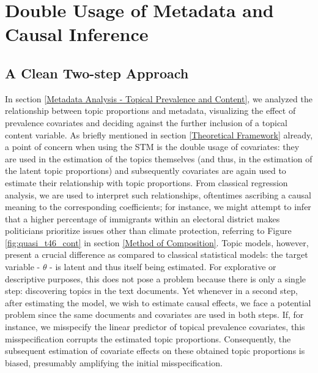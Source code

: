 \section{Double Usage of Metadata and Causal Inference}
\label{Overfitting and Causal Inference - Alternative Modeling Strategies}

\subsection{A Clean Two-step Approach}
\label{Two-step Approach: CTM}

In section \ref{Metadata Analysis - Topical Prevalence and Content}, we analyzed the relationship between topic proportions and metadata, visualizing the effect of prevalence covariates and deciding against the further inclusion of a topical content variable. As briefly mentioned in section \ref{Theoretical Framework} already, a point of concern when using the STM is the double usage of covariates: they are used in the estimation of the topics themselves (and thus, in the estimation of the latent topic proportions) and subsequently covariates are again used to estimate their relationship with topic proportions. From classical regression analysis, we are used to interpret such relationships, oftentimes ascribing a causal meaning to the corresponding coefficients; for instance, we might attempt to infer that a higher percentage of immigrants within an electoral district makes politicians prioritize issues other than climate protection, referring to Figure \ref{fig:quasi_t46_cont} in section \ref{Method of Composition}. Topic models, however, present a crucial difference as compared to classical statistical models: the target variable - $\theta$ - is latent and thus itself being estimated. For explorative or descriptive purposes, this does not pose a problem because there is only a single step: discovering topics in the text documents. Yet whenever in a second step, after estimating the model, we wish to estimate causal effects, we face a potential problem since the same documents and covariates are used in both steps. If, for instance, we misspecify the linear predictor of topical prevalence covariates, this misspecification corrupts the estimated topic proportions. Consequently, the subsequent estimation of covariate effects on these obtained topic proportions is biased, presumably amplifying the initial misspecification.


